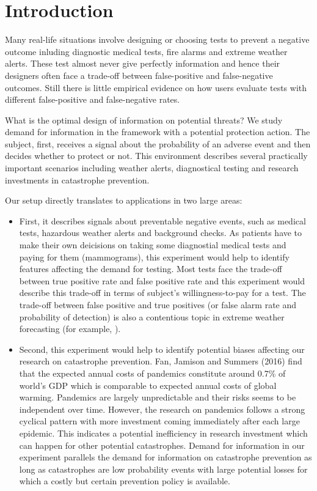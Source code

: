 \documentclass[12pt,a4paper]{article}
\begin{document}
\onehalfspacing
\section{Introduction}

Many real-life situations involve  designing or choosing tests to prevent a negative outcome inluding diagnostic medical tests, fire alarms and extreme weather alerts. These test almost never give perfectly information and hence their designers often face a trade-off between false-positive and false-negative outcomes. Still there is little empirical evidence on how users evaluate tests with different false-positive and false-negative rates. 

What is the optimal design of information on potential threats? We study demand for information in the framework with a potential protection action. The subject, first, receives a signal about the probability of an adverse event and then decides whether to protect or not. This environment describes several practically important scenarios including weather alerts, diagnostical testing and research investments in catastrophe prevention. 

Our setup directly translates to applications in two large areas:
\begin{itemize}
\item First, it describes signals about preventable negative events, such as medical tests, hazardous weather alerts and background checks. As patients have to make their own deicisions on taking some diagnostial medical tests and paying for them (mammograms), this experiment would help to identify features affecting the demand for testing. Most tests face the trade-off between true positive rate and false positive rate and this experiment would describe this trade-off in terms of subject's willingness-to-pay for a test.  The trade-off between false positive and true positives (or false alarm rate and probability of detection) is also a contentious topic in extreme weather forecasting (for example, \citet{simmons_false_2009}).

\item Second, this experiment would help to identify potential biases affecting our research on catastrophe prevention.  Fan, Jamison and Summers (2016) find that the expected annual costs of pandemics constitute around 0.7\% of world's GDP which is comparable to expected annual costs of global warming. Pandemics are largely unpredictable and their risks seems to be independent over time. However, the research on pandemics follows a strong cyclical pattern with more investment coming immediately after each large epidemic. This indicates a potential inefficiency in research investment which can happen for other potential catastrophes. Demand for information in our experiment parallels the demand for information on catastrophe prevention as long as catastrophes are low probability events with large potential losses for which a costly but certain prevention policy is available.
\end{itemize}
\end{document}
